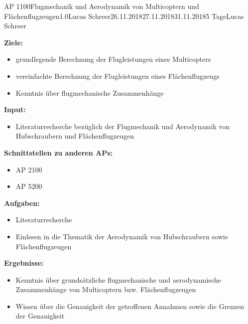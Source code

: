 \clearpage
\begin{wpd}{AP 1100}{Flugmechanik und Aerodynamik von Multicoptern und Flächenflugzeugen}{1.0}{Lucas Schreer}{26.11.2018}{27.11.2018}{31.11.2018}{5 Tage}{Lucas Schreer}
    {
    \textbf{Ziele:}
    \begin{itemize}
        \item grundlegende Berechnung der Flugleistungen eines Multicopters
        \item vereinfachte Berechnung der Flugleistungen eines Flächenflugzeugs
        \item Kenntnis über flugmechanische Zusammenhänge
    \end{itemize}
    \textbf{Input:}
    \begin{itemize}
        \item Literaturrecherche bezüglich der Flugmechanik und Aerodynamik von Hubschraubern und Flächenflugzeugen
    \end{itemize}
    \textbf{Schnittstellen zu anderen APs:}
    \begin{itemize}
        \item AP 2100
        \item AP 5200
    \end{itemize}
    \textbf{Aufgaben:}
    \begin{itemize}
        \item Literaturrecherche
        \item Einlesen in die Thematik der Aerodynamik von Hubschraubern sowie Flächenflugzeugen
    \end{itemize}
    \textbf{Ergebnisse:}
    \begin{itemize}
        \item Kenntnis über grundsätzliche flugmechanische und aerodynamische Zusammenhänge von Multicoptern bzw. Flächenflugzeugen
        \item Wissen über die Genauigkeit der getroffenen Annahmen sowie die Grenzen der Genauigkeit
    \end{itemize}
    }
\end{wpd}


